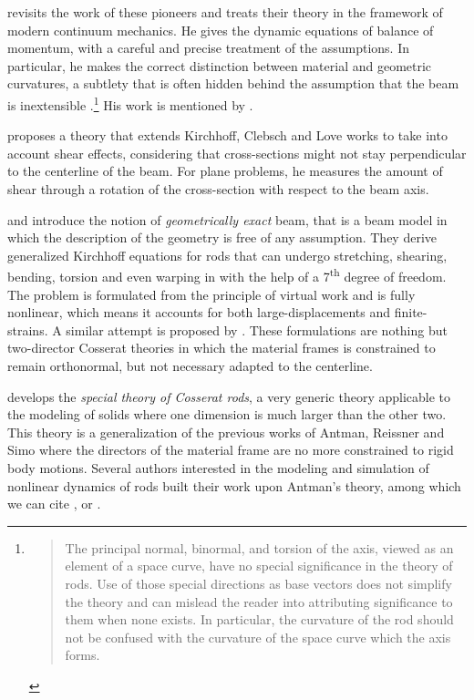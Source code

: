  revisits the work of these pioneers and treats their theory in the framework of modern continuum mechanics. He gives the dynamic equations of balance of momentum, with a careful and precise treatment of the assumptions. In particular, he makes the correct distinction between material and geometric curvatures, a subtlety that is often hidden behind the assumption that the beam is inextensible \cite{Adriaenssens1999,Douthe2007,DAmico2014}.\footnote{\blockcquote[p.~5]{Dill1992}{The principal normal, binormal, and torsion of the axis, viewed as an element of a space curve, have no special significance in the theory of rods. Use of those special directions as base vectors does not simplify the theory and can mislead the reader into attributing significance to them when none exists. In particular, the curvature of the rod should not be confused with the curvature of the space curve which the axis forms.}} His work is mentioned by . 


 proposes a theory that extends Kirchhoff, Clebsch and Love works to take into account shear effects, considering that cross-sections might not stay perpendicular to the centerline of the beam. For plane problems, he measures the amount of shear through a rotation of the cross-section with respect to the beam axis.

 and  introduce the notion of \emph{geometrically exact} beam, that is a beam model in which the description of the geometry is free of any assumption. They derive generalized Kirchhoff equations for rods that can undergo stretching, shearing, bending, torsion and even warping in \cite{Simo1991} with the help of a 7\textsuperscript{th} degree of freedom. The problem is formulated from the principle of virtual work and is fully nonlinear, which means it accounts for both large-displacements and finite-strains. A similar attempt is proposed by . These formulations are nothing but two-director Cosserat theories in which the material frames is constrained to remain orthonormal, but not necessary adapted to the centerline.
 
 develops the \emph{special theory of Cosserat rods}, a very generic theory applicable to the modeling of solids where one dimension is much larger than the other two. This theory is a generalization of the previous works of Antman, Reissner and Simo where the directors of the material frame are no more constrained to rigid body motions. Several authors interested in the modeling and simulation of nonlinear dynamics of rods built their work upon Antman's theory, among which we can cite ,  or .

